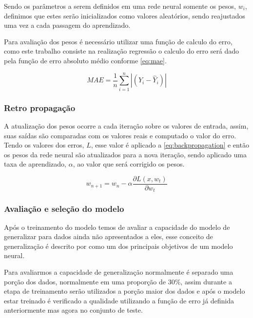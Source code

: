 \documentclass[
    12pt,
    oneside,
    a4paper,
    english,
    brazil
]{abntex2}
\begin{document}
Sendo os  parâmetros a  serem definidos  em uma rede  neural somente  os pesos,
$w_i$, definimos que  estes serão inicializados como  valores aleatórios, sendo
reajustados uma vez a cada passagem do aprendizado.

Para avaliação dos  pesos é necessário utilizar uma função  de calculo do erro,
como este trabalho consiste na realização regressão o calculo do erro será dado
pela função de erro absoluto médio conforme \autoref{eq:mae}.

\begin{equation}\label{eq:mae}
    MAE = \frac{1}{n}\sum_{i=1}^{n}{|(Y_i - \hat{Y}_i)|}
\end{equation}

\subsubsection{Retro propagação}

A atualização  dos pesos ocorre  a cada iteração  sobre os valores  de entrada,
assim,  suas  saídas  são  comparadas  com  os  valores  reais  e  computado  o
valor  do erro.  Tendo os  valores  dos erros,  $L$,  esse valor  é aplicado  a
\autoref{eq:backpropagation} e  então os pesos  da rede neural  são atualizados
para a  nova iteração,  sendo aplicado  uma taxa  de aprendizado,  $\alpha$, ao
valor que será corrigido os pesos.

\begin{equation}\label{eq:backpropagation}
    w_{n+1} = w_n - \alpha \frac{\partial L(x,w_t)}{\partial w_t}
\end{equation}

\subsubsection{Avaliação e seleção do modelo}

Após  o treinamento  do  modelo temos  de  avaliar a  capacidade  do modelo  de
generalizar  para  dados  ainda  não  apresentados a  eles,  esse  conceito  de
generalização  é descrito  por   como um  dos principais
objetivos de um modelo neural.

Para avaliarmos a capacidade de generalização normalmente é separado uma porção
dos  dados, normalmente  em uma  proporção de  30\%, assim  durante a  etapa de
treinamento serão  utilizados a porção  maior dos dados  e após o  modelo estar
treinado  é verificado  a qualidade  utilizando a  função de  erro já  definida
anteriormente mas agora no conjunto de teste.
\end{document}
